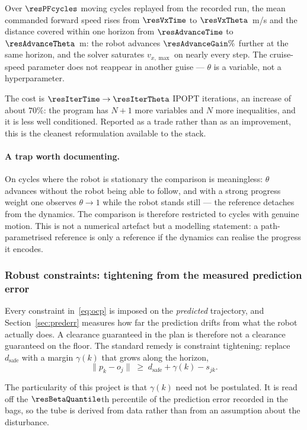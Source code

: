 \documentclass[11pt,a4paper]{article}
\newcommand{\dsafe}{d_{\mathrm{safe}}}
\begin{document}

Over $\resPFcycles$ moving cycles replayed from the recorded run, the mean commanded forward speed rises from
$\resVxTime$ to $\resVxTheta$~m/s and the distance covered within one horizon from $\resAdvanceTime$ to
$\resAdvanceTheta$~m: the robot advances $\resAdvanceGain\%$ further at the same horizon, and the solver
saturates $v_{x,\max}$ on nearly every step. The cruise-speed parameter does not reappear in another guise
--- $\theta$ is a variable, not a hyperparameter.

The cost is $\resIterTime\to\resIterTheta$ IPOPT iterations, an increase of about $70\%$: the program has
$N+1$ more variables and $N$ more inequalities, and it is less well conditioned. Reported as a trade rather
than as an improvement, this is the cleanest reformulation available to the stack.

\paragraph{A trap worth documenting.} On cycles where the robot is stationary the comparison is meaningless:
$\theta$ advances without the robot being able to follow, and with a strong progress weight one observes
$\theta\to1$ while the robot stands still --- the reference detaches from the dynamics. The comparison is
therefore restricted to cycles with genuine motion. This is not a numerical artefact but a modelling
statement: a path-parametrised reference is only a reference if the dynamics can realise the progress it
encodes.

\subsubsection{Robust constraints: tightening from the measured prediction error}
\label{sec:robust}

Every constraint in~\eqref{eq:ocp} is imposed on the \emph{predicted} trajectory, and
Section~\ref{sec:prederr} measures how far the prediction drifts from what the robot actually does. A
clearance guaranteed in the plan is therefore not a clearance guaranteed on the floor. The standard remedy is
constraint tightening: replace $\dsafe$ with a margin $\gamma(k)$ that grows along the horizon,
\begin{equation}
  \big\|p_k-o_j\big\| \;\ge\; \dsafe+\gamma(k)-s_{jk}.
  \label{eq:tighten}
\end{equation}

The particularity of this project is that $\gamma(k)$ need not be postulated. It is read off the
$\resBetaQuantile$th percentile of the prediction error recorded in the bags, so the tube is derived from
data rather than from an assumption about the disturbance.
\end{document}
